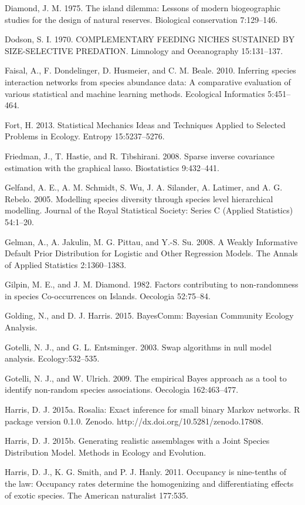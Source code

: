 \documentclass[12pt,]{article}
\begin{document}
\begin{spacing}{1.9}
\begin{flushleft}
Diamond, J. M. 1975. The island dilemma: Lessons of modern biogeographic
studies for the design of natural reserves. Biological conservation
7:129--146.

Dodson, S. I. 1970. COMPLEMENTARY FEEDING NICHES SUSTAINED BY
SIZE-SELECTIVE PREDATION. Limnology and Oceanography 15:131--137.

Faisal, A., F. Dondelinger, D. Husmeier, and C. M. Beale. 2010.
Inferring species interaction networks from species abundance data: A
comparative evaluation of various statistical and machine learning
methods. Ecological Informatics 5:451--464.

Fort, H. 2013. Statistical Mechanics Ideas and Techniques Applied to
Selected Problems in Ecology. Entropy 15:5237--5276.

Friedman, J., T. Hastie, and R. Tibshirani. 2008. Sparse inverse
covariance estimation with the graphical lasso. Biostatistics
9:432--441.

Gelfand, A. E., A. M. Schmidt, S. Wu, J. A. Silander, A. Latimer, and A.
G. Rebelo. 2005. Modelling species diversity through species level
hierarchical modelling. Journal of the Royal Statistical Society: Series
C (Applied Statistics) 54:1--20.

Gelman, A., A. Jakulin, M. G. Pittau, and Y.-S. Su. 2008. A Weakly
Informative Default Prior Distribution for Logistic and Other Regression
Models. The Annals of Applied Statistics 2:1360--1383.

Gilpin, M. E., and J. M. Diamond. 1982. Factors contributing to
non-randomness in species Co-occurrences on Islands. Oecologia
52:75--84.

Golding, N., and D. J. Harris. 2015. BayesComm: Bayesian Community
Ecology Analysis.

Gotelli, N. J., and G. L. Entsminger. 2003. Swap algorithms in null
model analysis. Ecology:532--535.

Gotelli, N. J., and W. Ulrich. 2009. The empirical Bayes approach as a
tool to identify non-random species associations. Oecologia
162:463--477.

Harris, D. J. 2015a. Rosalia: Exact inference for small binary Markov
networks. R package version 0.1.0. Zenodo.
http://dx.doi.org/10.5281/zenodo.17808.

Harris, D. J. 2015b. Generating realistic assemblages with a Joint
Species Distribution Model. Methods in Ecology and Evolution.

Harris, D. J., K. G. Smith, and P. J. Hanly. 2011. Occupancy is
nine-tenths of the law: Occupancy rates determine the homogenizing and
differentiating effects of exotic species. The American naturalist
177:535.


\end{flushleft}
\end{spacing}
\end{document}
